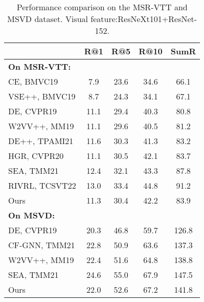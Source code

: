 \documentclass[sigconf]{acmart}
\begin{document}
\begin{table}[htb]
\caption{Performance comparison on the MSR-VTT and MSVD dataset. Visual feature:ResNeXt101+ResNet-152.}
\label{tab:msrvtt}
\begin{tabular}{llcccc}
\toprule
\multicolumn{2}{l}{} & \textbf{R@1} & \textbf{R@5} & \textbf{R@10} & \textbf{SumR} \\
\hline
\multicolumn{2}{l}{\textbf{On MSR-VTT:}} &  &  &  &  \\
\multicolumn{2}{l}{CE, BMVC19\cite{liu2019use}} & 7.9 & 23.6 & 34.6 & 66.1 \\
\multicolumn{2}{l}{VSE++, BMVC19\cite{faghri2017vse++}} & 8.7 & 24.3 & 34.1 & 67.1 \\
\multicolumn{2}{l}{DE, CVPR19\cite{dong2019dual}} & 11.1 & 29.4 & 40.3 & 80.8 \\
\multicolumn{2}{l}{W2VV++, MM19\cite{li2019w2vv++}} & 11.1 & 29.6 & 40.5 & 81.2 \\
\multicolumn{2}{l}{DE++, TPAMI21\cite{dong2021dual}} & 11.6 & 30.3 & 41.3 & 83.2 \\
\multicolumn{2}{l}{HGR, CVPR20\cite{chen2020fine}} & 11.1 & 30.5 & 42.1 & 83.7 \\
\multicolumn{2}{l}{SEA, TMM21\cite{li2020sea}} & 12.4 & 32.1 & 43.3 & 87.8 \\
\multicolumn{2}{l}{RIVRL, TCSVT22\cite{dong2022reading}} & 13.0 & 33.4 & 44.8 & 91.2 \\
\multicolumn{2}{l}{Ours} & 11.3 & 30.4 & 42.2 & 83.9 \\
\hline
\multicolumn{2}{l}{\textbf{On MSVD:}} &  &  &  &  \\
\multicolumn{2}{l}{DE, CVPR19\cite{dong2019dual}} & 20.3 & 46.8 & 59.7 & 126.8 \\
\multicolumn{2}{l}{CF-GNN, TMM21\cite{wang2020learning}} & 22.8 & 50.9 & 63.6 & 137.3 \\
\multicolumn{2}{l}{W2VV++, MM19\cite{li2019w2vv++}} & 22.4 & 51.6 & 64.8 & 138.8 \\
\multicolumn{2}{l}{SEA, TMM21\cite{li2020sea}} & 24.6 & 55.0 & 67.9 & 147.5 \\
\multicolumn{2}{l}{Ours} & 22.0 & 52.6 & 67.2 & 141.8 \\
\bottomrule
\end{tabular}
\end{table}
\end{document}
